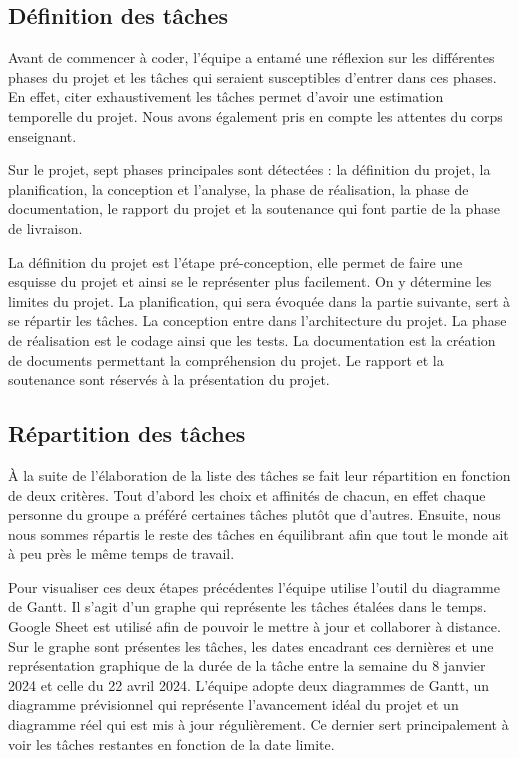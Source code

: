 \documentclass[a4paper,12pt]{article}
\begin{document}
\subsection{Définition des tâches}
Avant de commencer à coder, l’équipe a entamé une réflexion sur les différentes phases du projet et les tâches qui seraient susceptibles d’entrer dans ces phases. 
En effet, citer exhaustivement les tâches permet d’avoir une estimation temporelle du projet. 
Nous avons également pris en compte les attentes du corps enseignant.

Sur le projet, sept phases principales sont détectées : la définition du projet, la planification, la conception et l'analyse, la phase de réalisation, la phase de documentation, le rapport du projet et la soutenance qui font partie de la phase de livraison.

La définition du projet est l’étape pré-conception, elle permet de faire une esquisse du projet et ainsi se le représenter plus facilement. 
On y détermine les limites du projet. 
La planification, qui sera évoquée dans la partie suivante, sert à se répartir les tâches. 
La conception entre dans l’architecture du projet.
La phase de réalisation est le codage ainsi que les tests. 
La documentation est la création de documents permettant la compréhension du projet. 
Le rapport et la soutenance sont réservés à la présentation du projet.

\subsection{Répartition des tâches}
À la suite de l’élaboration de la liste des tâches se fait leur répartition en fonction de deux critères. 
Tout d’abord les choix et affinités de chacun, en effet chaque personne du groupe a préféré certaines tâches plutôt que d’autres. 
Ensuite, nous nous sommes répartis le reste des tâches en équilibrant afin que tout le monde ait à peu près le même temps de travail.

Pour visualiser ces deux étapes précédentes l’équipe utilise l'outil du diagramme de Gantt. 
Il s’agit d’un graphe qui représente les tâches étalées dans le temps. 
Google Sheet est utilisé afin de pouvoir le mettre à jour et collaborer à distance.
Sur le graphe sont présentes les tâches, les dates encadrant ces dernières et une représentation graphique de la durée de la tâche entre la semaine du 8 janvier 2024 et celle du 22 avril 2024.
L’équipe adopte deux diagrammes de Gantt, un diagramme prévisionnel qui représente l’avancement idéal du projet et un diagramme réel qui est mis à jour régulièrement. 
Ce dernier sert principalement à voir les tâches restantes en fonction de la date limite.
\end{document}
